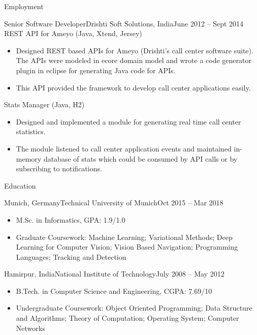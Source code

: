 \documentclass[]{mcdowellcv}
\begin{document}
\begin{cvsection}{Employment}
		\begin{cvsubsection}{Senior Software Developer}{Drishti Soft Solutions, India}{June 2012 -- Sept 2014}
			REST API for Ameyo (Java, Xtend, Jersey)
			\begin{itemize}
				\item Designed REST based APIs for Ameyo (Drishti's call center software suite). The APIs were modeled in ecore domain model and wrote a code generator plugin in eclipse for generating Java code for APIs. 
				\item This API provided the framework to develop call center applications easily.
			\end{itemize}
			
			Stats Manager (Java, H2)
			\begin{itemize}
				\item Designed and implemented a module for generating real time call center statistics. 
				\item The module listened to call center application events and maintained in-memory database of stats which could be consumed by API calls or by subscribing to notifications.
			\end{itemize}
		\end{cvsubsection}
	\end{cvsection}
	
  \newpage
	\begin{cvsection}{Education}
		\begin{cvsubsection}{Munich, Germany}{Technical University of Munich}{Oct 2015 -- Mar 2018}
			\begin{itemize}
				\item M.Sc. in Informatics, GPA: 1.9/1.0
				\item Graduate Coursework: Machine Learning; Variational Methods; Deep Learning for Computer Vision; Vision Based Navigation; Programming Languages; Tracking and Detection
			\end{itemize}
		\end{cvsubsection}
		\begin{cvsubsection}{Hamirpur, India}{National Institute of Technology}{July 2008 -- May 2012}
			\begin{itemize}
				\item B.Tech. in Computer Science and Engineering,  CGPA: 7.69/10
				\item Undergraduate Coursework: Object Oriented Programming; Data Structure and Algorithms; Theory of Computation; Operating System; Computer Networks 
			\end{itemize}
		\end{cvsubsection}
	\end{cvsection}
	
\end{document}
